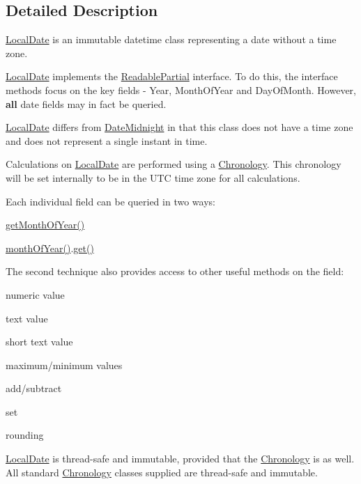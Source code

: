 \subsection{Detailed Description}
\hyperlink{classorg_1_1joda_1_1time_1_1_local_date}{Local\-Date} is an immutable datetime class representing a date without a time zone. 

\hyperlink{classorg_1_1joda_1_1time_1_1_local_date}{Local\-Date} implements the \hyperlink{interfaceorg_1_1joda_1_1time_1_1_readable_partial}{Readable\-Partial} interface. To do this, the interface methods focus on the key fields -\/ Year, Month\-Of\-Year and Day\-Of\-Month. However, {\bfseries all} date fields may in fact be queried. 

\hyperlink{classorg_1_1joda_1_1time_1_1_local_date}{Local\-Date} differs from \hyperlink{classorg_1_1joda_1_1time_1_1_date_midnight}{Date\-Midnight} in that this class does not have a time zone and does not represent a single instant in time. 

Calculations on \hyperlink{classorg_1_1joda_1_1time_1_1_local_date}{Local\-Date} are performed using a \hyperlink{classorg_1_1joda_1_1time_1_1_chronology}{Chronology}. This chronology will be set internally to be in the U\-T\-C time zone for all calculations.

Each individual field can be queried in two ways\-: 
\begin{DoxyItemize}
\item {\ttfamily \hyperlink{classorg_1_1joda_1_1time_1_1_local_date_a1711091371774e1d2f689d294de21e87}{get\-Month\-Of\-Year()}} 
\item {\ttfamily \hyperlink{classorg_1_1joda_1_1time_1_1_local_date_a00923ad74b6ab2f01e45d3f4804f15f7}{month\-Of\-Year()}.\hyperlink{classorg_1_1joda_1_1time_1_1_local_date_a1f215dbc2a3f142e34cd5475b8204421}{get()}} 
\end{DoxyItemize}The second technique also provides access to other useful methods on the field\-: 
\begin{DoxyItemize}
\item numeric value 
\item text value 
\item short text value 
\item maximum/minimum values 
\item add/subtract 
\item set 
\item rounding 
\end{DoxyItemize}

\hyperlink{classorg_1_1joda_1_1time_1_1_local_date}{Local\-Date} is thread-\/safe and immutable, provided that the \hyperlink{classorg_1_1joda_1_1time_1_1_chronology}{Chronology} is as well. All standard \hyperlink{classorg_1_1joda_1_1time_1_1_chronology}{Chronology} classes supplied are thread-\/safe and immutable.

